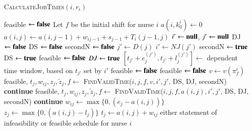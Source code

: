 \documentclass[a4paper,11pt,authoryear]{elsarticle}
\begin{document}
\begin{algorithm}[htbp!]
\scriptsize
\caption{\textsc{CalculateJobTimes}$(i, r_i)$}
\label{alg:cjt}
\begin{algorithmic}[1]
	\State feasible $\gets \textbf{false}$
	\State Let $f$ be the initial shift for nurse $i$
	\State $a(i,k_{0}^i) \gets 0$
		\State $a(i,j) \gets a(i, j-1) + w_{ij-1} + s_{j-1} + T_i(j-1, j)$
		\State $i' \gets \textbf{null}$, $j' \gets \textbf{null}$
		\State DJ $\gets \textbf{false}$
		\State DS $\gets \textbf{false}$
		\State secondN $\gets \textbf{false}$
			\State $j' \gets D(j)$ %
			\State $i' \gets NJ(j')$ %
				\State secondN $\gets \textbf{true}$
			\EndIf
				\State DS $\gets \textbf{true}$
					\State feasible $\gets \textbf{false}$
					\Break
				\EndIf %
			\Else 
				\State $DJ \gets \textbf{true}$
					\State $[t_{j'} + e_j^{(j')}, t_{j'} + l_j^{(j')}] \gets$ dependent time window, based on $t_{j'}$ set by $i'$
						\State feasible $\gets \textbf{false}$
						\Break
							\State feasible $\gets \textbf{false}$
							\Break
						\EndIf
					\EndIf
				\EndIf %
			\EndIf %
		\EndIf %
			\State $v \gets v(\pi_{f}^{i})$
			\State feasible, $t_j, w_{ij}, z_j, \tilde{z}_j, f \gets$ \textsc{FindValidTime}($i, j, f, v, i', j'$, DS, DJ, secondN)
				\Break
			\Else \hspace{0.2mm} \textbf{continue}
			\EndIf
			\State feasible, $t_j, w_{ij}, z_j, \tilde{z}_j, f \gets$ \textsc{FindValidTime}($i, j, f, a(i,j), i', j'$, DS, DJ, secondN)
				\Break
			\Else \hspace{0.2mm} \textbf{continue}
			\EndIf
		\Else
			\State $w_{ij} \gets \max\{0, (e_j-a(i,j))\}$
			\State $z_j \gets \max\{0, (a(i,j) - l_j)\}$
			\State $t_j \gets a(i,j) + w_{ij}$
		\EndIf
	\EndFor
	\Return either statement of infeasibility or feasible schedule for nurse $i$
\end{algorithmic}
\end{algorithm}
\end{document}
